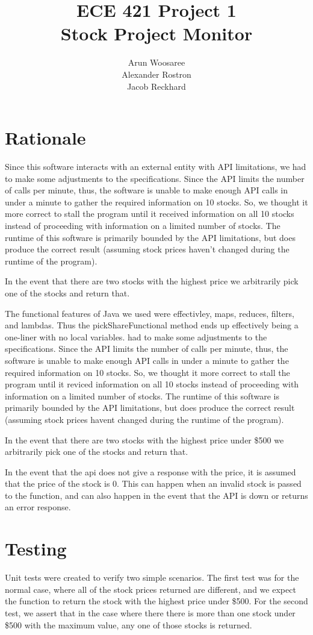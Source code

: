 \documentclass[letterpaper]{article}
\title{ECE 421 Project 1\\
Stock Project Monitor}
\author{Arun Woosaree\\
Alexander Rostron\\
Jacob Reckhard
}
\begin{document}
\maketitle %

\section{Rationale}
Since this software interacts with an external entity with API
limitations, we had to make some adjustments to the
specifications. Since the API limits the number of calls per minute,
thus, the software is unable to make enough API calls in under a
minute to gather the required information on 10 stocks. So, we thought
it more correct to stall the program until it received information on
all 10 stocks instead of proceeding with information on a limited
number of stocks. The runtime of this software is primarily bounded by
the API limitations, but does produce the correct result (assuming
stock prices haven't changed during the runtime of the program).

In the event that there are two stocks with the highest price we
arbitrarily pick one of the stocks and return that.

The functional features of Java we used were effectivley, maps,
reduces, filters, and lambdas. Thus the pickShareFunctional method
ends up effectively being a one-liner with no local variables.
had to make some adjustments to the specifications. Since the API limits the
number of calls per minute, thus, the software is unable to make enough API
calls in under a minute to gather the required information on 10 stocks. So,
we thought it more correct to stall the program until it reviced information
on all 10 stocks instead of proceeding with information on a limited number of
stocks. The runtime of this software is primarily bounded by the API
limitations, but does produce the correct result (assuming stock prices
havent changed during the runtime of the program).

In the event that there are two stocks with the highest price under \$500 we
arbitrarily pick one of the stocks and return that.

In the event that the api does not give a response with the price, it is assumed
that the price of the stock is 0. This can happen when an invalid stock is
passed to the function, and can also happen in the event that the API is down or
returns an error response.

\section{Testing}
Unit tests were created to verify two simple scenarios. The first test was for
the normal case, where all of the stock prices returned are different, and we
expect the function to return the stock with the highest price under \$500. For
the second test, we assert that in the case where there there is more than one
stock under \$500 with the maximum value, any one of those stocks is returned. 
\end{document}
